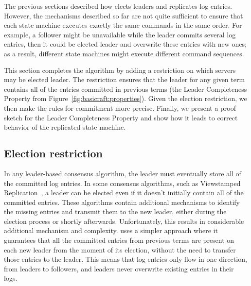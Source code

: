 The previous sections described how \name{} elects leaders and
replicates log entries. However, the mechanisms described so far are not
quite sufficient to ensure that each state machine executes exactly the
same commands in the same order. For example, a follower might be
unavailable while the leader commits several log entries, then it
could be elected leader and overwrite these entries with new ones;
as a result, different state machines might execute different command
sequences.

This section completes the \name{} algorithm by adding a restriction
on which servers may be elected leader. The restriction ensures that the leader
for any given term contains all of the entries committed in previous
terms (the Leader Completeness Property from Figure~\ref{fig:basicraft:properties}).
Given the election restriction, we then make the rules for commitment
more precise. Finally, we present a proof sketch for the Leader
Completeness Property and show how it leads to correct
behavior of the replicated state machine.

\subsection{Election restriction}

In any leader-based consensus algorithm, the leader must eventually store
all of the committed log entries. In some consensus algorithms, such
as Viewstamped Replication~\cite{Liskov:2012},
a leader can be elected even if it doesn't initially contain all of the
committed entries. These algorithms contain additional mechanisms to identify
the missing entries and transmit them to the new leader, either during the
election process or shortly afterwards. Unfortunately, this results in
considerable additional mechanism and complexity. \name{} uses a simpler
approach where it guarantees that all the committed entries from previous
terms are present on each new leader from the moment of its election,
without the need to transfer those entries to the leader. This means
that log entries only flow in one direction, from leaders
to followers, and leaders never overwrite existing entries in their logs.

